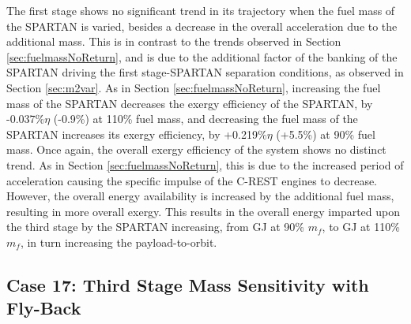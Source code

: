 The first stage shows no significant trend in its trajectory when the fuel mass of the SPARTAN is varied, besides a decrease in the overall acceleration due to the additional mass. This is in contrast to the trends observed in Section \ref{sec:fuelmassNoReturn}, and is due to the additional factor of the banking of the SPARTAN driving the first stage-SPARTAN separation conditions, as observed in Section \ref{sec:m2var}.
As in Section \ref{sec:fuelmassNoReturn}, increasing the fuel mass of the SPARTAN decreases the exergy efficiency of the SPARTAN, by -0.037\%$\eta$ (-0.9\%) at 110\% fuel mass, and decreasing the fuel mass of the SPARTAN increases its exergy efficiency, by +0.219\%$\eta$ (+5.5\%) at 90\% fuel mass. Once again, the overall exergy efficiency of the system shows no distinct trend. 
As in Section \ref{sec:fuelmassNoReturn}, this is due to the increased period of acceleration causing the specific impulse of the C-REST engines to decrease. However, the overall energy availability is increased by the additional fuel mass, resulting in more overall exergy. This results in the overall energy imparted upon the third stage by the SPARTAN increasing, from \secondExergythirdStagemFuelNinety GJ at 90\% $m_{f}$, to \secondExergythirdStagemFuelOneHundredTen GJ at 110\% $m_{f}$, in turn increasing the payload-to-orbit.




\subsection{Case 17: Third Stage Mass Sensitivity with Fly-Back}


